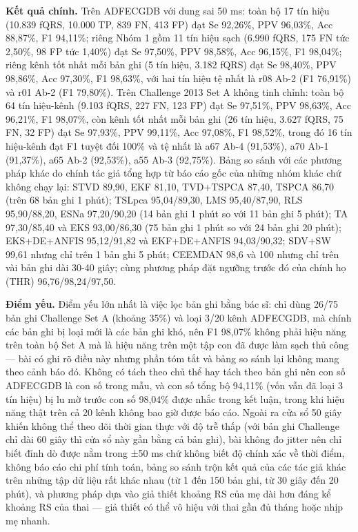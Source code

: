 \documentclass[12pt,a4paper]{article}
\begin{document}
\noindent \textbf{Kết quả chính.} Trên ADFECGDB với dung sai 50 ms: toàn bộ 17 tín hiệu (10.839 fQRS, 10.000 TP, 839 FN, 413 FP) đạt Se 92,26\%, PPV 96,03\%, Acc 88,87\%, F1 94,11\%; riêng Nhóm 1 gồm 11 tín hiệu sạch (6.990 fQRS, 175 FN tức 2,50\%, 98 FP tức 1,40\%) đạt Se 97,50\%, PPV 98,58\%, Acc 96,15\%, F1 98,04\%; riêng kênh tốt nhất mỗi bản ghi (5 tín hiệu, 3.182 fQRS) đạt Se 98,40\%, PPV 98,86\%, Acc 97,30\%, F1 98,63\%, với hai tín hiệu tệ nhất là r08 Ab-2 (F1 76,91\%) và r01 Ab-2 (F1 79,80\%). Trên Challenge 2013 Set A không tinh chỉnh: toàn bộ 64 tín hiệu-kênh (9.103 fQRS, 227 FN, 123 FP) đạt Se 97,51\%, PPV 98,63\%, Acc 96,21\%, F1 98,07\%, còn kênh tốt nhất mỗi bản ghi (26 tín hiệu, 3.627 fQRS, 75 FN, 32 FP) đạt Se 97,93\%, PPV 99,11\%, Acc 97,08\%, F1 98,52\%, trong đó 16 tín hiệu-kênh đạt F1 tuyệt đối 100\% và tệ nhất là a67 Ab-4 (91,53\%), a70 Ab-1 (91,37\%), a65 Ab-2 (92,53\%), a55 Ab-3 (92,75\%). Bảng so sánh với các phương pháp khác do chính tác giả tổng hợp từ báo cáo gốc của những nhóm khác chứ không chạy lại: STVD 89,90, EKF 81,10, TVD+TSPCA 87,40, TSPCA 86,70 (trên 68 bản ghi 1 phút); TSLpca 95,04/89,30, LMS 95,40/87,90, RLS 95,90/88,20, ESNa 97,20/90,20 (14 bản ghi 1 phút so với 11 bản ghi 5 phút); TA 97,30/85,40 và EKS 93,00/86,30 (75 bản ghi 1 phút so với 24 bản ghi 20 phút); EKS+DE+ANFIS 95,12/91,82 và EKF+DE+ANFIS 94,03/90,32; SDV+SW 99,61 nhưng chỉ trên 1 bản ghi 5 phút; CEEMDAN 98,6 và 100 nhưng chỉ trên vài bản ghi dài 30-40 giây; cùng phương pháp đặt ngưỡng trước đó của chính họ (THR) 96,76/98,24/97,50.\par\vspace{3pt}
\noindent \textbf{Điểm yếu.} Điểm yếu lớn nhất là việc lọc bản ghi bằng bác sĩ: chỉ dùng 26/75 bản ghi Challenge Set A (khoảng 35\%) và loại 3/20 kênh ADFECGDB, mà chính các bản ghi bị loại mới là các bản ghi khó, nên F1 98,07\% không phải hiệu năng trên toàn bộ Set A mà là hiệu năng trên một tập con đã được làm sạch thủ công — bài có ghi rõ điều này nhưng phần tóm tắt và bảng so sánh lại không mang theo cảnh báo đó. Không có tách theo chủ thể hay tách theo bản ghi nên con số ADFECGDB là con số trong mẫu, và con số tổng bộ 94,11\% (vốn vẫn đã loại 3 tín hiệu) bị lu mờ trước con số 98,04\% được nhắc trong kết luận, trong khi hiệu năng thật trên cả 20 kênh không bao giờ được báo cáo. Ngoài ra cửa sổ 50 giây khiến không thể theo dõi thời gian thực với độ trễ thấp (với bản ghi Challenge chỉ dài 60 giây thì cửa sổ này gần bằng cả bản ghi), bài không đo jitter nên chỉ biết đỉnh dò được nằm trong ±50 ms chứ không biết độ chính xác về thời điểm, không báo cáo chi phí tính toán, bảng so sánh trộn kết quả của các tác giả khác trên những tập dữ liệu rất khác nhau (từ 1 đến 150 bản ghi, từ 30 giây đến 20 phút), và phương pháp dựa vào giả thiết khoảng RS của mẹ dài hơn đáng kể khoảng RS của thai — giả thiết có thể vô hiệu với thai gần đủ tháng hoặc nhịp mẹ nhanh.\par\vspace{3pt}
\end{document}

